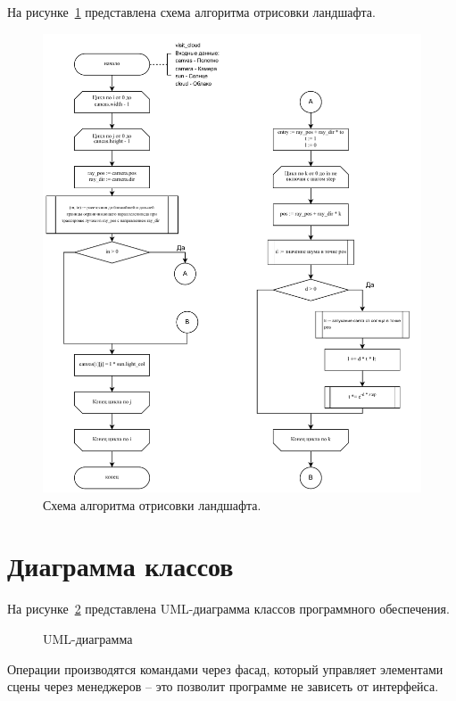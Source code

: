 \clearpage
На рисунке~\ref{fig:cloud_fc3} представлена схема алгоритма отрисовки ландшафта.
\begin{figure}[ht!]
	\centering
	\includegraphics[width=1.0\textwidth, page=4]{assets/img/cloud_flowchart.pdf}   
	\caption{Схема алгоритма отрисовки ландшафта.}
	\label{fig:cloud_fc3}
\end{figure}
\clearpage
\section{Диаграмма классов}
На рисунке~\ref{fig:uml} представлена UML-диаграмма классов программного обеспечения.

\begin{figure}[ht!]
	\centering
	   
	\caption{UML-диаграмма}
	\label{fig:uml}
\end{figure}

Операции производятся командами через фасад, который управляет элементами сцены через менеджеров -- это позволит программе не зависеть от интерфейса. 

